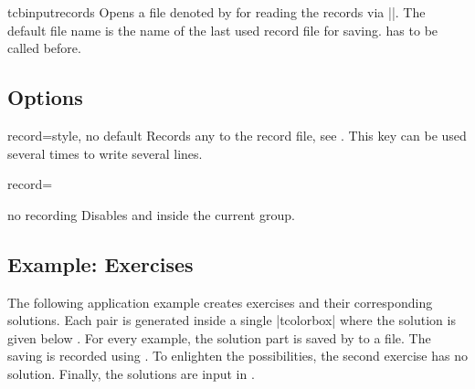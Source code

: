 \begin{docCommand}[doc new=2014-11-28]{tcbinputrecords}{}
  Opens a file denoted by  for reading the records via ||.
  The default file name is the name of the last used record file for saving.
   has to be called before.
\end{docCommand}


\subsection{Options}\label{sec:recording-options}
\begin{docTcbKey}[][doc new=2014-11-28]{record}{=}{style, no default}
  Records any  to the record file, see .
  This key can be used several times to write several lines.
  \begin{dispListing}
  record={\string{}}
  \end{dispListing}
\end{docTcbKey}

\begin{docTcbKey}[][doc new=2014-11-28]{no recording}{}{}
  Disables  and  inside the current
  group.
\end{docTcbKey}


\clearpage
\subsection{Example: Exercises}\label{sec:recording-exercises}
The following application example creates exercises and their corresponding
solutions. Each pair is generated inside a single |tcolorbox| where the
solution is given below . For every example, the solution part
is saved by  to a file. The saving is recorded using
. To enlighten the possibilities, the second exercise
has no solution. Finally, the solutions are input in .


